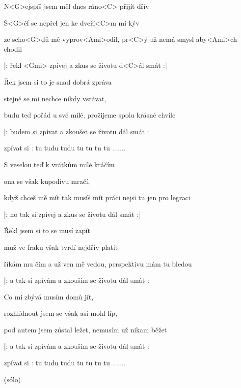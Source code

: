 

\zs
N<G>ejspíš jsem měl dnes ráno<C> přijít dřív 

Š<G>éf se nepřel jen ke dveří<C>m mi kýv 

ze scho<G>dů mě vyprov<Ami>odil, pr<C>ý už nemá smysl aby<Ami>ch chodil 

|: řekl <Gmi> zpívej a zkus se životu d<C>ál smát :| 
\ks

\zs
Řek jsem si to je snad dobrá zpráva 

stejně se mi nechce nikdy vstávat, 

budu teď pořád u své milé, prožijeme spolu krásné chvíle 

|: budem si zpívat a zkoušet se životu dál smát :| 
\ks

\zr
zpívat si : tu tudu tudu tu tu tu tu ....... 
\kr

\zs
S veselou teď k vrátkům milé kráčím 

ona se však kupodivu mračí, 

když chceš mě mít tak musíš mít práci nejsi tu jen pro legraci 

|: no tak si zpívej a zkus se životu dál smát :| 
\ks

\zs
Řekl jsem si to se musí zapít 

muž ve fraku však tvrdí nejdřív platit 

říkám mu čím a už ven mě vedou, perspektivu mám tu bledou 

|: a tak si zpívám a zkouším se životu dál smát :| 
\ks

\zs
Co mi zbývá musím domů jít, 

rozhlídnout jsem se však asi mohl líp, 

pod autem jsem zůstal ležet, nemusím už nikam běžet 

|: a tak si zpívám a zkouším se životu dál smát :| 
\ks

\zr
zpívat si : tu tudu tudu tu tu tu tu ....... 
\kr

\zr
(sólo)
\kr

\kp
